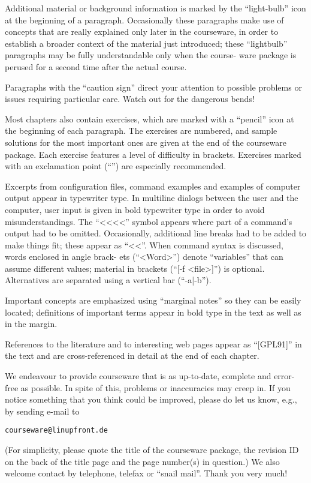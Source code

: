 Additional material or background information is marked by the “light-bulb” icon at the beginning of a paragraph. Occasionally these paragraphs make use of concepts that are really explained only later in the courseware, in order to establish a broader context of the material just introduced; these “lightbulb” paragraphs may be fully understandable only when the course- ware package is perused for a second time after the actual course.

Paragraphs with the “caution sign” direct your attention to possible problems or issues requiring particular care. Watch out for the dangerous bends!

Most chapters also contain exercises, which are marked with a “pencil” icon at the beginning of each paragraph. The exercises are numbered, and sample solutions for the most important ones are given at the end of the courseware package. Each exercise features a level of difficulty in brackets. Exercises marked with an exclamation point (“\!”) are especially recommended.

Excerpts from configuration files, command examples and examples of computer output appear in typewriter type. In multiline dialogs between the user and the computer, user input is given in bold typewriter type in order to avoid misunderstandings. The “<<<<” symbol appears where part of a command’s output had to be omitted. Occasionally, additional line breaks had to be added to make things fit; these appear as “<<”. When command syntax is discussed, words enclosed in angle brack- ets (“<Word>”) denote “variables” that can assume different values; material in brackets (“[-f <file>]”) is optional. Alternatives are separated using a vertical bar (“-a|-b”).

Important concepts are emphasized using “marginal notes” so they can be easily located; definitions of important terms appear in bold type in the text as well as in the margin.

References to the literature and to interesting web pages appear as “[GPL91]” in the text and are cross-referenced in detail at the end of each chapter.

We endeavour to provide courseware that is as up-to-date, complete and error- free as possible. In spite of this, problems or inaccuracies may creep in. If you notice something that you think could be improved, please do let us know, e.g., by sending e-mail to
\begin{verbatim}
courseware@linupfront.de
\end{verbatim}
(For simplicity, please quote the title of the courseware package, the revision ID on the back of the title page and the page number(s) in question.) We also welcome contact by telephone, telefax or “snail mail”. Thank you very much!